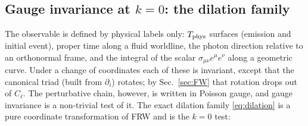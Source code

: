 \subsection{Gauge invariance at \texorpdfstring{$k=0$}{k=0}: the dilation family}
\label{sec:check_dilation}
The observable is defined by physical labels only: $T_{\rm phys}$ surfaces (emission and initial event), proper time along a fluid worldline,
the photon direction relative to an orthonormal frame, and the integral of the scalar $\sigma_{\mu\nu}e^\mu e^\nu$ along a geometric curve.
Under a change of coordinates each of these is invariant, except that the canonical triad (built from $\partial_i$) rotates; by
Sec.~\ref{sec:FW} that rotation drops out of $C_\ell$.  The perturbative chain, however, is written in Poisson gauge, and gauge invariance is a
non-trivial test of it.  The exact dilation family \eqref{eq:dilation} is a pure coordinate transformation of FRW and is the $k=0$ test:
